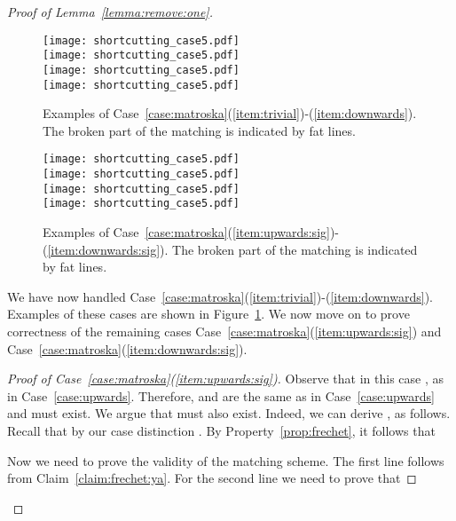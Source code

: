 \documentclass[11pt, letter]{article}
\newcommand{\lemref}[1]{Lemma~\ref{lemma:#1}}
\newcommand{\figlab}[1]{\label{fig:#1}}
\newcommand{\figref}[1]{Figure~\ref{fig:#1}}
\newcommand{\caseref}[1]{Case~\ref{case:#1}}
\newcommand{\claimref}[1]{Claim~\ref{claim:#1}}
\newcommand{\propref}[1]{Property~\ref{prop:#1}}
\begin{document}
\begin{proof}[Proof of \lemref{remove:one}]
\begin{figure}\centering
\texttt{[image: shortcutting\_case5.pdf]}\\
\vspace{\baselineskip}
\texttt{[image: shortcutting\_case5.pdf]}\\
\vspace{\baselineskip}
\texttt{[image: shortcutting\_case5.pdf]}\\
\vspace{\baselineskip}
\texttt{[image: shortcutting\_case5.pdf]}\\
\caption{Examples of
\caseref{matroska}(\ref{item:trivial})-(\ref{item:downwards}).  The broken part of the matching
 is indicated by fat lines.}
\figlab{shortcutting:case5i}
\end{figure}

\begin{figure}\centering
\texttt{[image: shortcutting\_case5.pdf]}\\
\vspace{\baselineskip}
\texttt{[image: shortcutting\_case5.pdf]}\\
\vspace{\baselineskip}
\texttt{[image: shortcutting\_case5.pdf]}\\
\vspace{\baselineskip}
\texttt{[image: shortcutting\_case5.pdf]}\\
\caption{Examples of
\caseref{matroska}(\ref{item:upwards:sig})-(\ref{item:downwards:sig}).  The broken part of the matching
 is indicated by fat lines.}
\figlab{shortcutting:case5v}
\end{figure}

We have now handled
\caseref{matroska}(\ref{item:trivial})-(\ref{item:downwards}). Examples of these
cases are shown in \figref{shortcutting:case5i}.
We now move on to prove correctness of the remaining cases 
\caseref{matroska}(\ref{item:upwards:sig}) and \caseref{matroska}(\ref{item:downwards:sig}). 



\begin{proof}[Proof of \caseref{matroska}(\ref{item:upwards:sig})]
Observe that in this case , as in \caseref{upwards}.
Therefore,  and  are the same as in \caseref{upwards} and must exist.
We argue that  must also exist. Indeed, we can derive 
,
as follows. Recall that by our case distinction .
By \propref{frechet}, it follows that


Now we need to prove the validity of the matching scheme.
The first line follows from \claimref{frechet:ya}.
For the second line we need to prove that


\end{proof}
\end{proof}
\end{document}
